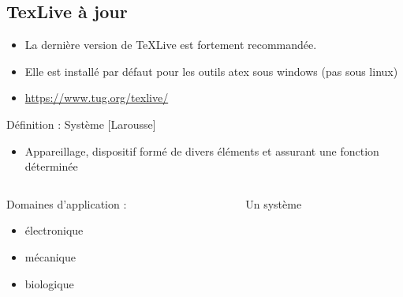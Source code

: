 \documentclass[./beamerCoursIsenLaTeX.tex]{subfiles}
\begin{document}
\subsection{TexLive à jour}
\begin{frame}
 \begin{itemize}
  \item La dernière version de TeXLive est fortement recommandée.
  \item Elle est installé par défaut pour les outils atex sous windows (pas sous linux)
  \item \url{https://www.tug.org/texlive/}
 \end{itemize}
 \begin{block}{Définition : Système [Larousse]}
  \begin{itemize}
   \item Appareillage, dispositif formé de divers éléments et assurant une fonction déterminée
  \end{itemize}
 \end{block}
 \null
 \begin{columns}
  \begin{column}{5cm}
   Domaines d'application :
   \begin{itemize}
    \itemsep1pt
    \item électronique
    \item mécanique
    \item biologique
   \end{itemize}
  \end{column}
  \begin{column}{6cm}
   \begin{figure}[!ht]
    \begin{center}
    \end{center}
    \caption{Un système}
   \end{figure}
  \end{column}
 \end{columns}
\end{frame}
\end{document}
